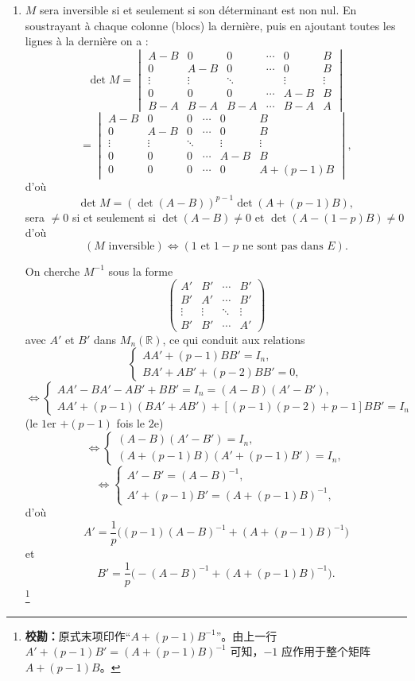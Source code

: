 \begin{enumerate}[label=\arabic*.,leftmargin=2.2em,itemsep=1.2em]
\item $M$ sera inversible si et seulement si son déterminant est non nul. En soustrayant à chaque colonne (blocs) la dernière, puis en ajoutant toutes les lignes à la dernière on a :
\[
\det M=
\begin{vmatrix}
A-B&0&0&\cdots&0&B\\
0&A-B&0&\cdots&0&B\\
\vdots&\vdots&\ddots&&\vdots&\vdots\\
0&0&0&\cdots&A-B&B\\
B-A&B-A&B-A&\cdots&B-A&A
\end{vmatrix}
\]
\[
=\begin{vmatrix}
A-B&0&0&\cdots&0&B\\
0&A-B&0&\cdots&0&B\\
\vdots&\vdots&\ddots&&\vdots&\vdots\\
0&0&0&\cdots&A-B&B\\
0&0&0&\cdots&0&A+(p-1)B
\end{vmatrix},
\]
d'où
\[
\det M=(\det(A-B))^{p-1}\det(A+(p-1)B),
\]
sera $\ne0$ si et seulement si $\det(A-B)\ne0$ et $\det(A-(1-p)B)\ne0$ d'où
\[
(M\text{ inversible})\Longleftrightarrow(1\text{ et }1-p\text{ ne sont pas dans }E).
\]

On cherche $M^{-1}$ sous la forme
\[
\begin{pmatrix}
A'&B'&\cdots&B'\\
B'&A'&\cdots&B'\\
\vdots&\vdots&\ddots&\vdots\\
B'&B'&\cdots&A'
\end{pmatrix}
\]
avec $A'$ et $B'$ dans $M_n(\mathbb R)$, ce qui conduit aux relations
\[
\begin{cases}
AA'+(p-1)BB'=I_n,\\
BA'+AB'+(p-2)BB'=0,
\end{cases}
\]
\[
\Longleftrightarrow
\begin{cases}
AA'-BA'-AB'+BB'=I_n=(A-B)(A'-B'),\\
AA'+(p-1)(BA'+AB')+[(p-1)(p-2)+p-1]BB'=I_n
\end{cases}
\]
(le $1$er $+(p-1)$ fois le $2$e)
\[
\Longleftrightarrow
\begin{cases}
(A-B)(A'-B')=I_n,\\
(A+(p-1)B)(A'+(p-1)B')=I_n,
\end{cases}
\]
\[
\Longleftrightarrow
\begin{cases}
A'-B'=(A-B)^{-1},\\
A'+(p-1)B'=(A+(p-1)B)^{-1},
\end{cases}
\]
d'où
\[
A'=\frac1p\bigl((p-1)(A-B)^{-1}+(A+(p-1)B)^{-1}\bigr)
\]
et
\[
B'=\frac1p\bigl(-(A-B)^{-1}+(A+(p-1)B)^{-1}\bigr).
\]
\mbox{}\footnote{\textbf{校勘：}原式末项印作“$A+(p-1)B^{-1}$”。由上一行 $A'+(p-1)B'=(A+(p-1)B)^{-1}$ 可知，$-1$ 应作用于整个矩阵 $A+(p-1)B$。}


\end{enumerate}
